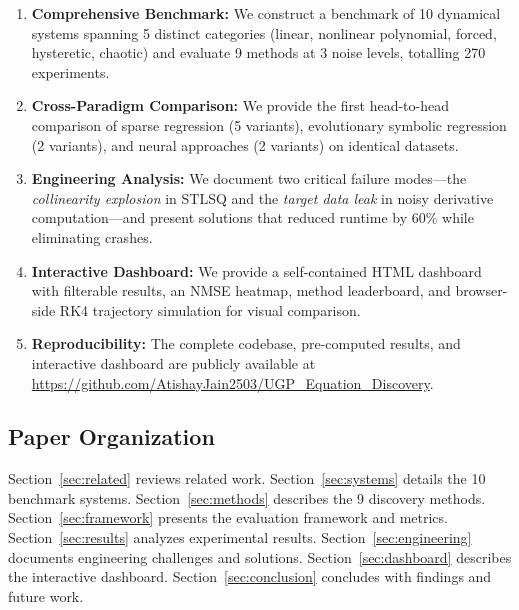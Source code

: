 \begin{enumerate}
    \item \textbf{Comprehensive Benchmark:} We construct a benchmark of 10 dynamical systems spanning 5 distinct categories (linear, nonlinear polynomial, forced, hysteretic, chaotic) and evaluate 9 methods at 3 noise levels, totalling 270 experiments.
    
    \item \textbf{Cross-Paradigm Comparison:} We provide the first head-to-head comparison of sparse regression (5 variants), evolutionary symbolic regression (2 variants), and neural approaches (2 variants) on identical datasets.
    
    \item \textbf{Engineering Analysis:} We document two critical failure modes---the \textit{collinearity explosion} in STLSQ and the \textit{target data leak} in noisy derivative computation---and present solutions that reduced runtime by 60\% while eliminating crashes.
    
    \item \textbf{Interactive Dashboard:} We provide a self-contained HTML dashboard with filterable results, an NMSE heatmap, method leaderboard, and browser-side RK4 trajectory simulation for visual comparison.
    
    \item \textbf{Reproducibility:} The complete codebase, pre-computed results, and interactive dashboard are publicly available at \url{https://github.com/AtishayJain2503/UGP_Equation_Discovery}.
\end{enumerate}

\subsection{Paper Organization}

Section~\ref{sec:related} reviews related work. Section~\ref{sec:systems} details the 10 benchmark systems. Section~\ref{sec:methods} describes the 9 discovery methods. Section~\ref{sec:framework} presents the evaluation framework and metrics. Section~\ref{sec:results} analyzes experimental results. Section~\ref{sec:engineering} documents engineering challenges and solutions. Section~\ref{sec:dashboard} describes the interactive dashboard. Section~\ref{sec:conclusion} concludes with findings and future work.
